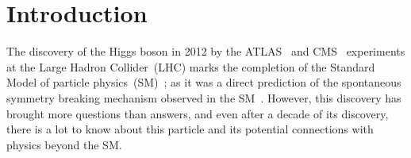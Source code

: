 

\chapter{Introduction}
\par The discovery of the Higgs boson in 2012 by the ATLAS~\cite{ATLAS:2012yve}  and CMS~\cite{CMS:2012qbp} experiments at the {L}arge {H}adron {C}ollider~(LHC) marks the completion of the Standard Model of particle physics~(SM)~\cite{salam1,salam2,PhysRevLett.19.1264}; as it was a direct prediction of the spontaneous symmetry breaking mechanism observed in the SM~\cite{PhysRevLett.13.321,PhysRevLett.13.508,HIGGS1964132,PhysRevLett.13.585,Guralnik:2009jd}. However, this discovery has brought more questions than answers, and even after a decade of its discovery, there is a lot to know about this particle and its potential connections with physics beyond the SM.

